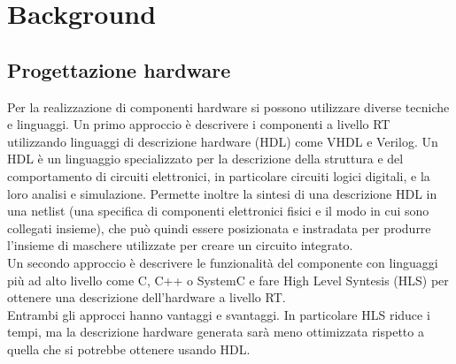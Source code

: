 \documentclass[]{IEEEtran}
\begin{document}
\section{Background}

\subsection{Progettazione hardware}
Per la realizzazione di componenti hardware si possono utilizzare diverse tecniche e linguaggi.
Un primo approccio è descrivere i componenti a livello RT utilizzando linguaggi di descrizione hardware (HDL) come VHDL e Verilog.
Un HDL è un linguaggio specializzato per la descrizione della struttura e del comportamento di circuiti elettronici, in particolare circuiti logici digitali, e la loro analisi e simulazione. Permette inoltre la sintesi di una descrizione HDL in una netlist (una specifica di componenti elettronici fisici e il modo in cui sono collegati insieme), che può quindi essere posizionata e instradata per produrre l'insieme di maschere utilizzate per creare un circuito integrato\cite{HDL}.
\\Un secondo approccio è descrivere le funzionalità del componente con linguaggi più ad alto livello come C, C++ o SystemC\cite{SystemC} e fare High Level Syntesis (HLS) per ottenere una descrizione dell'hardware a livello RT\cite{HLS}.
\\Entrambi gli approcci hanno vantaggi e svantaggi. In particolare HLS riduce i tempi, ma la descrizione hardware generata sarà meno ottimizzata rispetto a quella che si potrebbe ottenere usando HDL.
\end{document}
